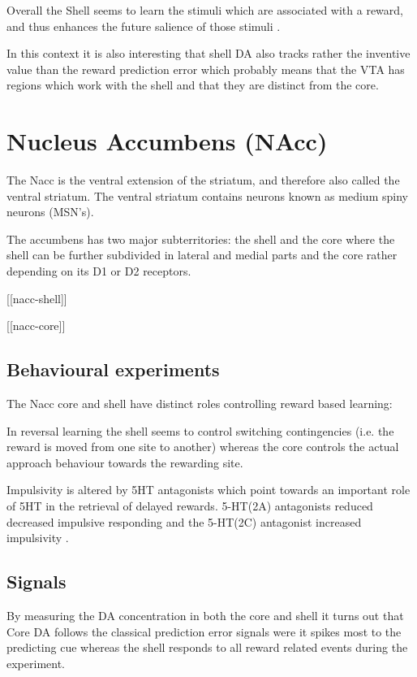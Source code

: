 \documentclass[12pt,a4paper]{article}
\let\oldsection\section
\renewcommand\section{\clearpage\oldsection}
\begin{document}
Overall the Shell seems to learn the stimuli which are associated with a reward, and thus enhances the future salience of those stimuli \citep{Cassidy2017}.

In this context it is also interesting that shell DA also tracks rather the inventive value than the reward prediction error \citep{Sackett2017} which probably means that the VTA has regions which work with the shell and that they are distinct from the core.




\section{Nucleus Accumbens (NAcc)}

The Nacc is the ventral extension of the striatum, and therefore also called the ventral striatum.  The ventral striatum contains neurons known as medium spiny neurons (MSN's).

The accumbens has two major subterritories: the shell and the core 
\citep{heimer91} where the shell can be further subdivided \citep{Usuda1998} in lateral and medial parts and the core rather depending on its D1 or D2 receptors.

[[nacc-shell]]

[[nacc-core]]

\subsection{Behavioural experiments}

The Nacc core and shell have distinct roles controlling reward based learning:

In reversal learning \citep{Dalton2014} the shell seems to control switching contingencies (i.e. the reward is moved from one site to another) whereas the core controls the actual approach behaviour towards the rewarding site.

Impulsivity is altered by 5HT antagonists which point towards an important role of 5HT in the retrieval of delayed rewards. 5-HT(2A) antagonists reduced decreased impulsive responding and the 5-HT(2C) antagonist increased impulsivity \citep{Robinson2008}.

\subsection{Signals}

By measuring the DA concentration in both the core and shell \citep{Saddoris2015} it turns out that Core DA follows the classical prediction error signals were it spikes most to the predicting cue whereas the shell responds to all reward related events during the experiment.
\end{document}
